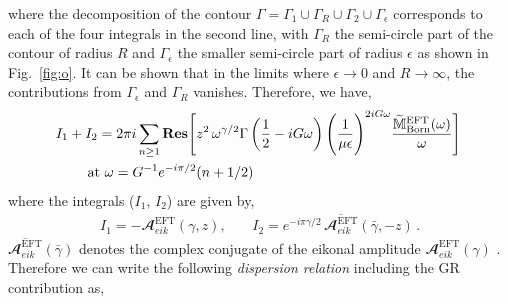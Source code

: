 \noindent
where the decomposition of the contour $\Gamma=\Gamma_1\cup \Gamma_R\cup \Gamma_2\cup \Gamma_\epsilon$ corresponds to each of the four integrals in the second line, with $\Gamma_R$ the semi-circle part of the contour of radius $R$ and $\Gamma_\epsilon$ the smaller semi-circle part of radius $\epsilon$ as shown in Fig.~\eqref{fig:o}. It can be shown that in the limits where $\epsilon\to0$ and $R\to\infty$, the contributions from $\Gamma_\epsilon$ and $\Gamma_R$ vanishes. Therefore, we have,
\begin{align}
    &I_1+I_2=2\pi i \sum_{n\geq1} \textbf{Res}\Bigg[z^2\,\omega^{\gamma/2}\Gamma\left(\frac{1}{2}-iG\omega\right)\Bigg(\frac{1}{\mu \epsilon}\Bigg)^{2iG\omega}\frac{\widetilde{\mathbb{M}}_{\textrm{Born}}^{\textrm{EFT}}(\omega)}{\omega}\Bigg]\,\nonumber\\&\hspace{0.8cm}\text{at} \,\,\omega=G^{-1}e^{-i\pi/2}(n+1/2)
\end{align}
where the integrals ($I_1,\,I_2$) are given by,
\begin{align}
      I_1=-\mathbfcal{A}^{\textrm{EFT}}_{eik}(\gamma,z),\,\,\,\,\,\,\,\,\,\,\,
      I_2=e^{-i\pi \gamma/2}\,\overline{\mathbfcal{A}^{\textrm{EFT}}_{eik}}(\bar\gamma,-z) \,.
\end{align}
$\overline{\mathbfcal{A}^{\textrm{EFT}}_{eik}}(\bar \gamma) $ denotes the complex conjugate of the eikonal amplitude $\mathbfcal{A}^{\textrm{EFT}}_{eik}(\gamma)$ . Therefore we can write the following \textit{dispersion relation} including the GR contribution as,

